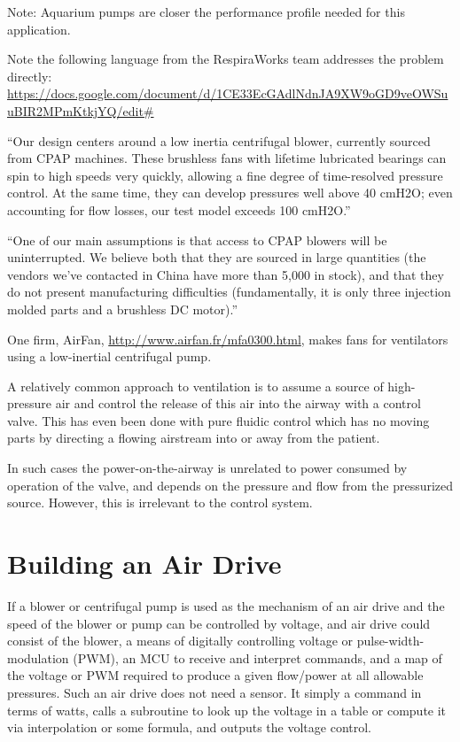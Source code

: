 \documentclass{article}
\begin{document}
Note: Aquarium pumps are closer the performance profile needed for this application.

Note the following language from the RespiraWorks team addresses the problem directly:
\url{https://docs.google.com/document/d/1CE33EcGAdlNdnJA9XW9oGD9veOWSuuBIR2MPmKtkjYQ/edit#}

``Our design centers around a low inertia centrifugal blower, currently sourced from CPAP machines. These brushless fans with lifetime lubricated bearings can spin to high speeds very quickly, allowing a fine degree of time-resolved pressure control. At the same time, they can develop pressures well above 40 cmH2O; even accounting for flow losses, our test model exceeds 100 cmH2O.''

``One of our main assumptions is that access to CPAP blowers will be uninterrupted. We believe both that they are sourced in large quantities (the vendors we’ve contacted in China have more than 5,000 in stock), and that they do not present manufacturing difficulties (fundamentally, it is only three injection molded parts and a brushless DC motor).''

One firm, AirFan, \url{http://www.airfan.fr/mfa0300.html}, makes fans for ventilators using a low-inertial centrifugal pump.

A relatively common approach to ventilation is to assume a source of high-pressure air and control the release of this air
into the airway with a control valve. This has even been done with pure fluidic control which has no moving parts
by directing a flowing airstream into or away from the patient.

In such cases the power-on-the-airway is unrelated to power consumed by operation of the valve, and
depends on the pressure and flow from the pressurized source. However, this is irrelevant to the control system.

\section{Building an Air Drive}

If a blower or centrifugal pump is used as the mechanism of an air drive and the speed of the
blower or pump can be controlled by voltage, and air drive could consist of the blower,
a means of digitally controlling voltage or pulse-width-modulation (PWM), an MCU to receive and interpret commands, and
a map of the voltage  or PWM required to produce a given flow/power at all allowable pressures.
Such an air drive does not need a sensor.
It simply a command in terms of watts, calls a subroutine to look up the voltage in a table
or compute it via interpolation or some formula, and outputs the voltage control.
\end{document}
